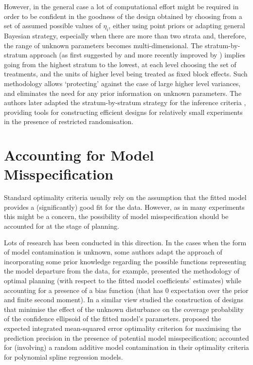 However, in the general case a lot of computational effort might be required in order to be confident in the goodness of the design obtained by choosing from a set of assumed possible values of $\eta_i$, either using point priors or adapting general Bayesian strategy, especially when there are more than two strata and, therefore, the range of unknown parameters becomes multi-dimensional. The stratum-by-stratum approach (as first suggested by \cite{Trinca2001multistratum} and more recently improved by \cite{Trinca2015improved}) implies going from the highest stratum to the lowest, at each level choosing the set of treatments, and the units of higher level being treated as fixed block effects. Such methodology allows `protecting' against the case of large higher level variances, and eliminates the need for any prior information on unknown parameters. The authors later adapted the stratum-by-stratum  strategy for the inference criteria \citep{Trinca2016SPinference}, providing tools for constructing efficient designs for relatively small experiments in the presence of restricted randomisation.

\section{Accounting for Model Misspecification}
\label{sec::back_misspecification}
Standard optimality criteria usually rely on the assumption that the fitted model provides a (significantly) good fit for the data. However, as in many experiments this might be a concern, the possibility of model misspecification should be accounted for at the stage of planning. 

Lots of research has been conducted in this direction. In the cases when the form of model contamination is unknown, some authors adapt the approach of incorporating some prior knowledge regarding the possible functions representing the model departure from the data, for example, \cite{Notz1989Optimal} presented the methodology of optimal planning (with respect to the fitted model coefficients' estimates) while accounting for a presence of a bias function (that has $0$ expectation over the prior and finite second moment). In a similar view \cite{Wiens1993Designs} studied the construction of designs that minimise the effect of the unknown disturbance on the coverage probability of the confidence ellipsoid of the fitted model's parameters. \cite{Allen2003Experimental} proposed the expected integrated mean-squared error optimality criterion for maximising the prediction precision in the presence of potential model misspecification; \cite{Woods2005designing} accounted for (involving) a random additive model contamination in their optimality criteria for polynomial spline regression models.


